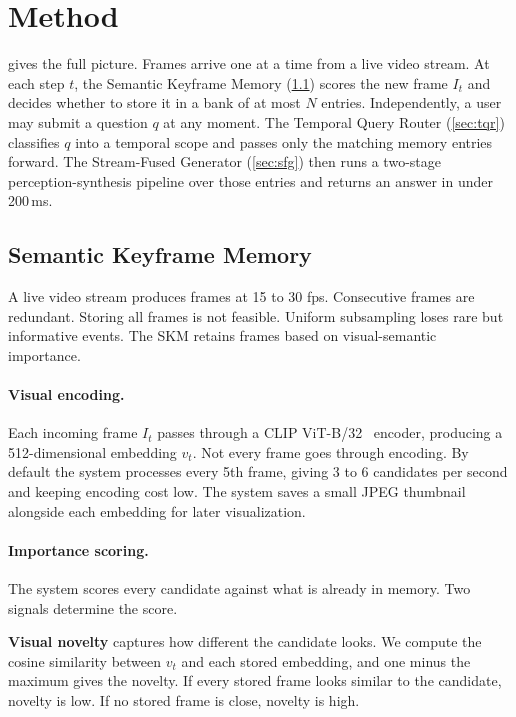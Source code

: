 \section{Method}
\label{sec:method}

 gives the full picture.
Frames arrive one at a time from a live video stream. At each step $t$, the Semantic Keyframe Memory (\cref{sec:skm}) scores the new frame $I_t$ and decides whether to store it in a bank of at most $N$ entries.
Independently, a user may submit a question $q$ at any moment.
The Temporal Query Router (\cref{sec:tqr}) classifies $q$ into a temporal scope and passes only the matching memory entries forward.
The Stream-Fused Generator (\cref{sec:sfg}) then runs a two-stage perception-synthesis pipeline over those entries and returns an answer in under 200\,ms.

\subsection{Semantic Keyframe Memory}
\label{sec:skm}

A live video stream produces frames at 15 to 30 fps. Consecutive frames are redundant.
Storing all frames is not feasible. Uniform subsampling loses rare but informative events.
The SKM retains frames based on visual-semantic importance.

\paragraph{Visual encoding.}
Each incoming frame $I_t$ passes through a CLIP ViT-B/32~\cite{radford2021clip} encoder, producing a 512-dimensional embedding $v_t$.
Not every frame goes through encoding. By default the system processes every 5th frame, giving 3 to 6 candidates per second and keeping encoding cost low.
The system saves a small JPEG thumbnail alongside each embedding for later visualization.

\paragraph{Importance scoring.}
The system scores every candidate against what is already in memory. Two signals determine the score.

\textbf{Visual novelty} captures how different the candidate looks. We compute the cosine similarity between $v_t$ and each stored embedding, and one minus the maximum gives the novelty. If every stored frame looks similar to the candidate, novelty is low. If no stored frame is close, novelty is high.

